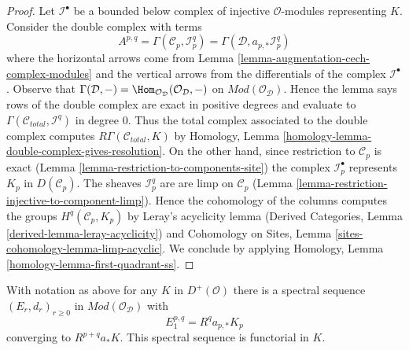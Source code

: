 \begin{proof}
Let $\mathcal{I}^\bullet$ be a bounded below complex of injective
$\mathcal{O}$-modules representing $K$. Consider the double complex with terms
$$
A^{p, q} = \Gamma(\mathcal{C}_p, \mathcal{I}^q_p) =
\Gamma(\mathcal{D}, a_{p, *}\mathcal{I}^q_p)
$$
where the horizontal arrows come from
Lemma \ref{lemma-augmentation-cech-complex-modules}
and the vertical arrows from the differentials of the
complex $\mathcal{I}^\bullet$. Observe that
$\Gamma(\mathcal{D}, -) =
\Hom_{\mathcal{O}_\mathcal{D}}(\mathcal{O}_\mathcal{D}, -)$
on $\textit{Mod}(\mathcal{O}_\mathcal{D})$. Hence the lemma
says rows of the double complex are exact
in positive degrees and evaluate to
$\Gamma(\mathcal{C}_{total}, \mathcal{I}^q)$ in degree $0$.
Thus the total complex associated to the double complex
computes $R\Gamma(\mathcal{C}_{total}, K)$ by
Homology, Lemma \ref{homology-lemma-double-complex-gives-resolution}.
On the other hand, since restriction to $\mathcal{C}_p$ is exact
(Lemma \ref{lemma-restriction-to-components-site})
the complex $\mathcal{I}_p^\bullet$ represents $K_p$ in
$D(\mathcal{C}_p)$. The sheaves $\mathcal{I}_p^q$ are
are limp on $\mathcal{C}_p$
(Lemma \ref{lemma-restriction-injective-to-component-limp}).
Hence the cohomology of the columns computes the groups
$H^q(\mathcal{C}_p, K_p)$ by Leray's acyclicity lemma
(Derived Categories, Lemma \ref{derived-lemma-leray-acyclicity})
and
Cohomology on Sites, Lemma \ref{sites-cohomology-lemma-limp-acyclic}.
We conclude by applying
Homology, Lemma \ref{homology-lemma-first-quadrant-ss}.
\end{proof}

\begin{lemma}
\label{lemma-augmentation-spectral-sequence-modules}
With notation as above for any $K$ in $D^+(\mathcal{O})$ there is a spectral
sequence $(E_r, d_r)_{r \geq 0}$ in $\textit{Mod}(\mathcal{O}_\mathcal{D})$
with
$$
E_1^{p, q} = R^qa_{p, *} K_p
$$
converging to $R^{p + q}a_*K$. This spectral sequence is functorial in $K$.
\end{lemma}

